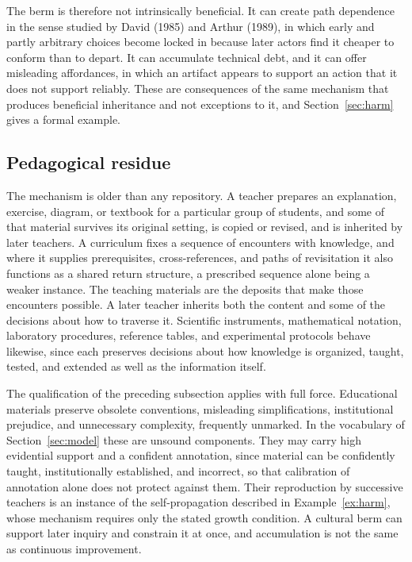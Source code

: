 \documentclass[11pt]{article}
\theoremstyle{definition}
\theoremstyle{remark}
\begin{document}
The berm is therefore not intrinsically beneficial. It can create path dependence in the sense studied by David (1985) and Arthur (1989), in which early and partly arbitrary choices become locked in because later actors find it cheaper to conform than to depart. It can accumulate technical debt, and it can offer misleading affordances, in which an artifact appears to support an action that it does not support reliably. These are consequences of the same mechanism that produces beneficial inheritance and not exceptions to it, and Section~\ref{sec:harm} gives a formal example.

\subsection{Pedagogical residue}

The mechanism is older than any repository. A teacher prepares an explanation, exercise, diagram, or textbook for a particular group of students, and some of that material survives its original setting, is copied or revised, and is inherited by later teachers. A curriculum fixes a sequence of encounters with knowledge, and where it supplies prerequisites, cross-references, and paths of revisitation it also functions as a shared return structure, a prescribed sequence alone being a weaker instance. The teaching materials are the deposits that make those encounters possible. A later teacher inherits both the content and some of the decisions about how to traverse it. Scientific instruments, mathematical notation, laboratory procedures, reference tables, and experimental protocols behave likewise, since each preserves decisions about how knowledge is organized, taught, tested, and extended as well as the information itself.

The qualification of the preceding subsection applies with full force. Educational materials preserve obsolete conventions, misleading simplifications, institutional prejudice, and unnecessary complexity, frequently unmarked. In the vocabulary of Section~\ref{sec:model} these are unsound components. They may carry high evidential support and a confident annotation, since material can be confidently taught, institutionally established, and incorrect, so that calibration of annotation alone does not protect against them. Their reproduction by successive teachers is an instance of the self-propagation described in Example~\ref{ex:harm}, whose mechanism requires only the stated growth condition. A cultural berm can support later inquiry and constrain it at once, and accumulation is not the same as continuous improvement.
\end{document}
